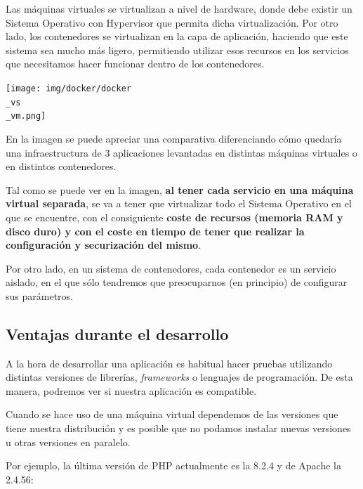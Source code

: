Las máquinas virtuales se virtualizan a nivel de hardware, donde debe existir un Sistema Operativo con Hypervisor que permita dicha virtualización. Por otro lado, los contenedores se virtualizan en la capa de aplicación, haciendo que este sistema sea mucho más ligero, permitiendo utilizar esos recursos en los servicios que necesitamos hacer funcionar dentro de los contenedores.

\vspace{-15pt}
\begin{center}
    \texttt{[image: img/docker/docker\\\_vs\\\_vm.png]}
\end{center}
\vspace{-15pt}


En la imagen se puede apreciar una comparativa diferenciando cómo quedaría una infraestructura de 3 aplicaciones levantadas en distintas máquinas virtuales o en distintos contenedores.

Tal como se puede ver en la imagen, \textbf{al tener cada servicio en una máquina virtual separada}, se va a tener que virtualizar todo el Sistema Operativo en el que se encuentre, con el consiguiente \textbf{coste de recursos (memoria RAM y disco duro) y con el coste en tiempo de tener que realizar la configuración y securización del mismo}.


Por otro lado, en un sistema de contenedores, cada contenedor es un servicio aislado, en el que sólo tendremos que preocuparnos (en principio) de configurar sus parámetros.


\subsection{Ventajas durante el desarrollo}

A la hora de desarrollar una aplicación es habitual hacer pruebas utilizando distintas versiones de librerías, \textit{frameworks} o lenguajes de programación. De esta manera, podremos ver si nuestra aplicación es compatible.

Cuando se hace uso de una máquina virtual dependemos de las versiones que tiene nuestra distribución y es posible que no podamos instalar nuevas versiones u otras versiones en paralelo.

Por ejemplo, la última versión de PHP actualmente es la 8.2.4 y de Apache la 2.4.56:

